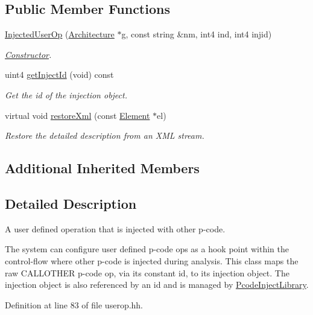 \subsection*{Public Member Functions}
\begin{DoxyCompactItemize}
\item 
\mbox{\hyperlink{class_injected_user_op_ac13cad210c1ecb0f372ce4bb6fcdb47d}{Injected\+User\+Op}} (\mbox{\hyperlink{class_architecture}{Architecture}} $\ast$g, const string \&nm, int4 ind, int4 injid)
\begin{DoxyCompactList}\small\item\em \mbox{\hyperlink{class_constructor}{Constructor}}. \end{DoxyCompactList}\item 
uint4 \mbox{\hyperlink{class_injected_user_op_adbbdc913ccab5c4b3f1eca442dd5f93c}{get\+Inject\+Id}} (void) const
\begin{DoxyCompactList}\small\item\em Get the id of the injection object. \end{DoxyCompactList}\item 
virtual void \mbox{\hyperlink{class_injected_user_op_ae0eb3ef1744912d47b0fd5f01c079515}{restore\+Xml}} (const \mbox{\hyperlink{class_element}{Element}} $\ast$el)
\begin{DoxyCompactList}\small\item\em Restore the detailed description from an X\+ML stream. \end{DoxyCompactList}\end{DoxyCompactItemize}
\subsection*{Additional Inherited Members}


\subsection{Detailed Description}
A user defined operation that is injected with other p-\/code. 

The system can configure user defined p-\/code ops as a hook point within the control-\/flow where other p-\/code is injected during analysis. This class maps the raw C\+A\+L\+L\+O\+T\+H\+ER p-\/code op, via its constant id, to its injection object. The injection object is also referenced by an id and is managed by \mbox{\hyperlink{class_pcode_inject_library}{Pcode\+Inject\+Library}}. 

Definition at line 83 of file userop.\+hh.



